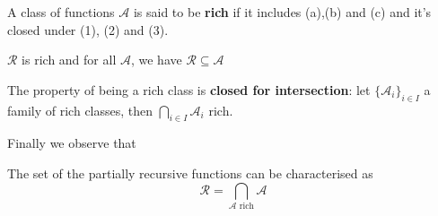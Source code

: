 \begin{definition}
    A class of functions $\mathcal{A}$ is said to be \textbf{rich} if it includes (a),(b) and (c) and it's closed under (1), (2) and (3).
\end{definition}

$\mathcal{R}$ is rich and for all $\mathcal{A}$, we have $\mathcal{R}\subseteq\mathcal{A}$

\begin{remark}
  The property of being a rich class is \textbf{closed for intersection}:
  let $\{\mathcal{A}_i\}_{i\in I}$ a family of rich classes, then $\bigcap_{i\in I}\mathcal{A}_i$ rich.
\end{remark}

Finally we observe that

\begin{proposition}
  The set of the partially recursive functions can be characterised as
\begin{equation*}
  \mathcal{R} = \bigcap_{
  \mathcal{A} \text{ rich}} \mathcal{A}
\end{equation*}
\end{proposition}


